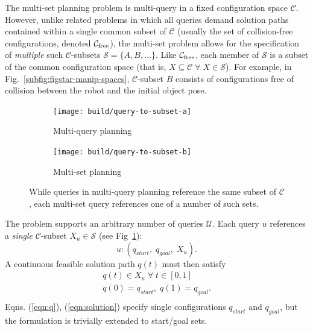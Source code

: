The multi-set planning problem is multi-query in
a fixed configuration space $\mathcal{C}$.
However, unlike related problems in which all
queries demand solution paths contained within a single common subset of
$\mathcal{C}$
(usually the set of collision-free configurations, denoted
$\mathcal{C}_{\mbox{\scriptsize free}}$),
the multi-set problem allows for the specification of
\emph{multiple} such $\mathcal{C}$-subsets
$\mathcal{S} = \{ A, B, \dots \}$.
Like $\mathcal{C}_{\mbox{\scriptsize free}}$,
each member of $\mathcal{S}$
is a subset of the common configuration space
(that is,
$X \subseteq \mathcal{C} \;\forall\; X \in \mathcal{S}$).
For example, in Fig.~\ref{subfig:figstar-manip-spaces},
$\mathcal{C}$-subset $B$
consists of configurations
free of collision between the robot and
the initial object pose.

\begin{figure}
\centering
\begin{subfigure}[t]{0.45\linewidth}
\centering
\texttt{[image: build/query-to-subset-a]}
\caption{Multi-query planning}
\end{subfigure}%
\quad\quad%
\begin{subfigure}[t]{0.45\linewidth}
\centering
\texttt{[image: build/query-to-subset-b]}
\caption{Multi-set planning}
\end{subfigure}
\caption{While queries in multi-query planning reference
  the same subset of $\mathcal{C}$,
  each multi-set query references one of a number of such sets.}
\label{fig:query-to-subset}
\end{figure}

The problem supports an arbitrary number of queries $\mathcal{U}$.
Each query $u$ references a \emph{single}
$\mathcal{C}$-subset $X_u \in \mathcal{S}$
(see Fig~\ref{fig:query-to-subset}):
\begin{equation}
  u : ( q_{start},\; q_{goal},\; X_u ) .
  \label{eqn:q}
\end{equation}
A continuous feasible solution path $q(t)$ must then satisfy
\begin{equation}
  \begin{array}{c}
  q(t) \in X_u \;\forall\; t \in [0,1] \\
  q(0) = q_{start},\; q(1) = q_{goal} . \\
  \end{array}
  \label{eqn:solution}
\end{equation}
Eqns. (\ref{eqn:q}), (\ref{eqn:solution})
specify single configurations
$q_{start}$ and $q_{goal}$,
but the formulation is trivially extended to start/goal sets.

